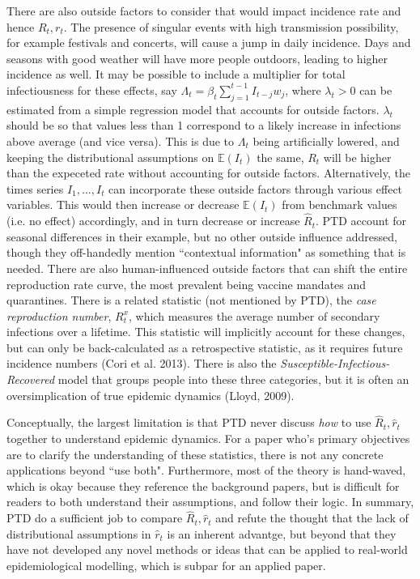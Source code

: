 \documentclass[12pt]{article}
\begin{document}
      There are also outside factors to consider that would impact incidence rate and hence $R_t, r_t$. 
      The presence of singular events with high transmission possibility, for example festivals and concerts, 
      will cause a jump in daily incidence. Days and seasons with good weather will have more people outdoors, leading to higher
      incidence as well. It may be possible to include a multiplier for total infectiousness for these effects, say 
      $\Lambda_t = \beta_t \sum_{j=1}^{t-1}I_{t - j}w_j$, where $\lambda_t > 0$ can be estimated from a simple regression model
      that accounts for outside factors. $\lambda_t$ should be so that values less than 1 correspond to a likely
      increase in infections above average (and vice versa). This is due to $\Lambda_t$ being artificially lowered, 
      and keeping the distributional assumptions on $\mathbb{E}(I_t)$ the same, 
      $R_t$ will be higher than the expeceted rate without accounting for outside factors. Alternatively, the times series
      $I_1,...,I_t$ can incorporate these outside factors through various effect variables. This would then increase or decrease
      $\mathbb{E}(I_t)$ from benchmark values (i.e. no effect) accordingly, and in turn decrease or increase $\hat{R}_t$.
      PTD account for seasonal differences in their example, but no other outside influence addressed, though 
      they off-handedly mention ``contextual information" as something that is needed. There are also human-influenced outside
      factors that can shift the entire reproduction rate curve, the most prevalent being vaccine mandates and quarantines. 
      There is a related statistic (not mentioned by PTD), 
      the \textit{case reproduction number}, $R^x_t$, which measures the average number of secondary infections over a lifetime.
      This statistic will implicitly account for these changes, but can only be back-calculated as a
      retrospective statistic, as it requires future incidence numbers (Cori et al. 2013). There is also the 
      \textit{Susceptible-Infectious-Recovered} model that groups people into these three categories, but it is often an
      oversimplication of true epidemic dynamics (Lloyd, 2009). 
      
      Conceptually, the largest limitation is that PTD never discuss \textit{how} to use $\hat{R}_t, \hat{r}_t$ together to
      understand epidemic dynamics. For a paper who's primary objectives are to clarify the understanding of these statistics, 
      there is not any concrete applications beyond ``use both". Furthermore, most of the theory is hand-waved, which is okay
      because they reference the background papers, but is difficult for readers to both understand their assumptions, and follow
      their logic. In summary, PTD do a sufficient job to compare $\hat{R}_t, \hat{r}_t$ and refute the thought that the lack
      of distributional assumptions in $\hat{r}_t$ is an inherent advantge, but beyond that they have not developed any novel 
      methods or ideas that can be applied to real-world epidemiological modelling, which is subpar for an applied paper. 
\end{document}
